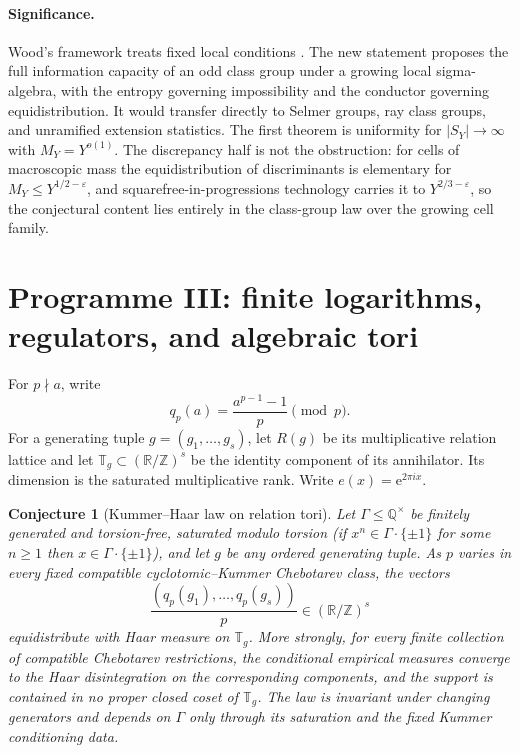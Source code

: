 \documentclass[11pt]{article}
\newtheorem{conjecture}{Conjecture}
\theoremstyle{definition}
\newcommand{\e}{\mathrm{e}}
\newcommand{\Z}{\mathbb Z}
\newcommand{\Q}{\mathbb Q}
\newcommand{\R}{\mathbb R}
\newcommand{\T}{\mathbb T}
\newcommand{\eps}{\varepsilon}
\providecommand{\Z}{\mathbb Z}
\providecommand{\Q}{\mathbb Q}
\providecommand{\R}{\mathbb R}
\providecommand{\T}{\mathbb T}
\begin{document}
\paragraph{Significance.}
Wood's framework treats fixed local conditions \cite{Wood}.  The new statement proposes
the full information capacity of an odd class group under a growing local sigma-algebra,
with the entropy governing impossibility and the conductor governing
equidistribution.  It would transfer directly
to Selmer groups, ray class groups, and unramified extension statistics.  The first theorem is uniformity for $|S_Y|\to\infty$ with $M_Y=Y^{o(1)}$.  The discrepancy half is not the obstruction: for cells of macroscopic mass the equidistribution of discriminants is elementary for $M_Y\le Y^{1/2-\eps}$, and squarefree-in-progressions technology carries it to $Y^{2/3-\eps}$, so the conjectural content lies entirely in the class-group law over the growing cell family.

\section{Programme III: finite logarithms, regulators, and algebraic tori}

For $p\nmid a$, write
\[
 q_p(a)=\frac{a^{p-1}-1}{p}\pmod p.
\]
For a generating tuple $g=(g_1,\ldots,g_s)$, let $R(g)$ be its multiplicative
relation lattice and let $\T_g\subset(\R/\Z)^s$ be the identity component of its
annihilator.  Its dimension is the saturated multiplicative rank. Write $e(x)=\e^{2\pi ix}$.

\begin{conjecture}[Kummer--Haar law on relation tori]\label{s11}
Let $\Gamma\le\Q^\times$ be finitely generated and torsion-free, saturated modulo torsion (if $x^n\in\Gamma\cdot\{\pm1\}$ for some $n\ge1$ then $x\in\Gamma\cdot\{\pm1\}$), and let
$g$ be any ordered generating tuple.  As $p$ varies in every fixed compatible
cyclotomic--Kummer Chebotarev class, the vectors
\[
 \frac{(q_p(g_1),\ldots,q_p(g_s))}{p}\in(\R/\Z)^s
\]
equidistribute with Haar measure on $\T_g$.  More strongly, for every finite collection
of compatible Chebotarev restrictions, the conditional empirical measures converge to
the Haar disintegration on the corresponding components, and the support is contained in no
proper closed coset of $\T_g$.  The law is invariant under changing generators and
depends on $\Gamma$ only through its saturation and the fixed Kummer conditioning data.
\end{conjecture}
\end{document}
